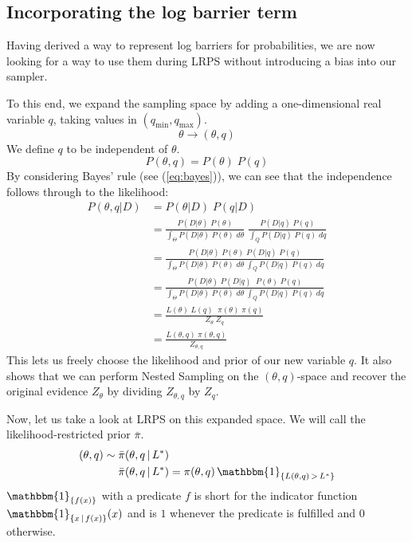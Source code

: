 \documentclass[12pt, a4paper]{report}
\begin{document}
\subsection{Incorporating the log barrier term}
Having derived a way to represent log barriers for probabilities, we are now looking for a way to use them during LRPS without introducing a bias into our sampler.

To this end, we expand the sampling space by adding a one-dimensional real variable $q$, taking values in $(q_{\textrm{min}}, q_{\textrm{max}})$.
$$
\theta \rightarrow (\theta, q)
$$
We define $q$ to be independent of $\theta$.
$$
P(\theta, q) = P(\theta) \; P(q)
$$
By considering Bayes' rule (see (\ref{eq:bayes})), we can see that the independence follows through to the likelihood:
\begin{align*}
    P(\theta, q | D) &= P(\theta | D) \; P(q | D) \\
    &= \frac{P(D | \theta) \; P(\theta)}{\int_\Theta P(D | \theta) \; P(\theta) \; d\theta} \; \frac{P(D | q) \; P(q)}{\int_Q P(D | q) \; P(q) \; dq} \\
    &= \frac{P(D | \theta) \; P(\theta) \; P(D | q) \; P(q)}{\int_\Theta P(D | \theta) \; P(\theta) \; d\theta \; \int_Q P(D | q) \; P(q) \; dq} \\
    &= \frac{P(D | \theta) \; P(D | q) \;\; P(\theta) \; P(q)}{\int_\Theta P(D | \theta) \; P(\theta) \; d\theta \; \int_Q P(D | q) \; P(q) \; dq} \\
    &= \frac{L(\theta) \; L(q) \;\; \pi(\theta) \; \pi(q)}{Z_\theta \; Z_q} \\
    &= \frac{L(\theta, q) \; \pi(\theta, q)}{Z_{\theta, q}}
\end{align*}
This lets us freely choose the likelihood and prior of our new variable $q$.
It also shows that we can perform Nested Sampling on the $(\theta, q)$-space and recover the original evidence $Z_\theta$ by dividing $Z_{\theta, q}$ by $Z_q$.

Now, let us take a look at LRPS on this expanded space.
We will call the likelihood-restricted prior $\bar{\pi}$.
\begin{align*}
    (\theta,q) \sim \; &\bar{\pi}(\theta, q \,|\, L^*) \\
    &\bar{\pi}(\theta, q \,|\, L^*) = \pi(\theta, q) \, \mathbbm{1}_{\{L(\theta, q) \, > \, L^*\}}
\end{align*}
$\mathbbm{1}_{\{f(x)\}}$ with a predicate $f$ is short for the indicator function $\mathbbm{1}_{\{x \,|\, f(x)\}}(x)$ and is $1$ whenever the predicate is fulfilled and $0$ otherwise.
\end{document}
